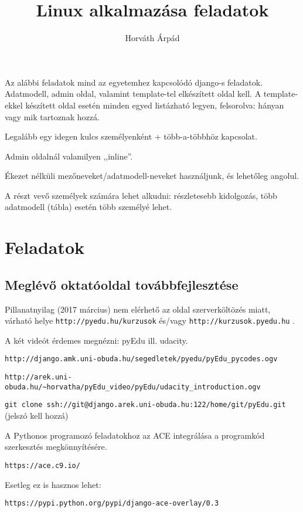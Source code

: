 \documentclass[a4paper]{article}
\begin{document}
\title{Linux alkalmazása feladatok}
\author{Horváth Árpád}
\maketitle

Az alábbi feladatok mind az egyetemhez kapcsolódó django-s feladatok.
Adatmodell, admin oldal, valamint template-tel elkészített oldal kell.
A template-ekkel készített oldal esetén minden egyed listázható legyen,
felsorolva: hányan vagy mik tartoznak hozzá.

Legalább egy idegen kulcs személyenként + több-a-többhöz kapcsolat.

Admin oldalnál valamilyen ,,inline''.

Ékezet nélküli mezőneveket/adatmodell-neveket használjunk, és lehetőleg angolul.

A részt vevő személyek számára lehet alkudni: részletesebb kidolgozás,
több adatmodell (tábla) esetén több személyé lehet.

\section{Feladatok}

\subsection{Meglévő oktatóoldal továbbfejlesztése}

Pillanatnyilag (2017 március) nem elérhető az oldal szerverköltözés
miatt,\\ várható helye \verb+http://pyedu.hu/kurzusok+ és/vagy
\verb+http://kurzusok.pyedu.hu+ .

A két videót érdemes megnézni: pyEdu ill. udacity.

\verb+http://django.amk.uni-obuda.hu/segedletek/pyedu/pyEdu_pycodes.ogv+

\verb+http://arek.uni-obuda.hu/~horvatha/pyEdu_video/pyEdu/udacity_introduction.ogv+

\verb+git clone ssh://git@django.arek.uni-obuda.hu:122/home/git/pyEdu.git+
(jelszó kell hozzá)

A Pythonos programozó feladatokhoz az ACE integrálása a programkód
szerkesztés megkönnyítésére.

\verb+https://ace.c9.io/+

Esetleg ez is hasznos lehet:

\verb+https://pypi.python.org/pypi/django-ace-overlay/0.3+
\end{document}
